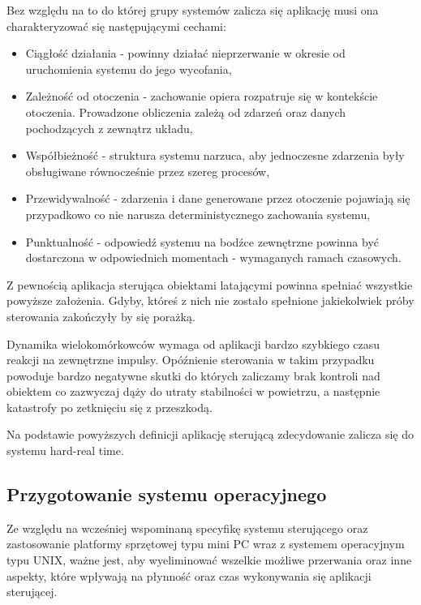 Bez względu na to do której grupy systemów zalicza się aplikację musi ona charakteryzować się następującymi cechami:

\begin{itemize}
	\item Ciągłość działania - powinny działać nieprzerwanie w okresie od uruchomienia systemu do jego wycofania,
	
	\item Zależność od otoczenia - zachowanie opiera rozpatruje się w kontekście otoczenia. Prowadzone obliczenia zależą od zdarzeń oraz danych pochodzących z zewnątrz układu,
	
	\item Współbieżność - struktura systemu narzuca, aby jednoczesne zdarzenia były obsługiwane równocześnie przez szereg procesów,
	
	\item Przewidywalność - zdarzenia i dane generowane przez otoczenie pojawiają się przypadkowo co nie narusza deterministycznego zachowania systemu,
	
	\item Punktualność - odpowiedź systemu na bodźce zewnętrzne powinna być dostarczona w odpowiednich momentach - wymaganych ramach czasowych.
\end{itemize}

Z pewnością aplikacja sterująca obiektami latającymi powinna spełniać wszystkie powyższe założenia. Gdyby, któreś z nich nie zostało spełnione jakiekolwiek próby sterowania zakończyły by się porażką.

Dynamika wielokomórkowców wymaga od aplikacji bardzo szybkiego czasu reakcji na zewnętrzne impulsy. Opóźnienie sterowania w takim przypadku powoduje bardzo negatywne skutki do których zaliczamy brak kontroli nad obiektem co zazwyczaj dąży do utraty stabilności w powietrzu, a następnie katastrofy po zetknięciu się z przeszkodą.

Na podstawie powyższych definicji aplikację sterującą zdecydowanie zalicza się do systemu hard-real time. 


\subsection{Przygotowanie systemu operacyjnego}
Ze względu na wcześniej wspominaną specyfikę systemu sterującego oraz zastosowanie platformy sprzętowej typu mini PC wraz z systemem operacyjnym typu UNIX, ważne jest, aby wyeliminować wszelkie możliwe przerwania oraz inne aspekty, które wpływają na płynność oraz czas wykonywania się aplikacji sterującej.

